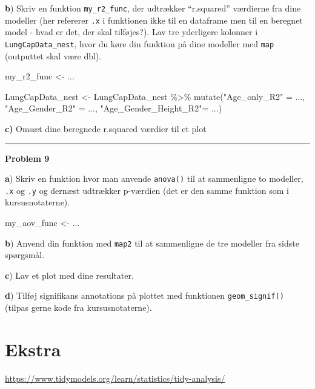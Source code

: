 \documentclass[
]{book}
\newenvironment{Shaded}{\begin{snugshade}}{\end{snugshade}}
\newcommand{\FunctionTok}[1]{\textcolor[rgb]{0.00,0.00,0.00}{#1}}
\newcommand{\NormalTok}[1]{#1}
\newcommand{\OtherTok}[1]{\textcolor[rgb]{0.56,0.35,0.01}{#1}}
\newcommand{\SpecialCharTok}[1]{\textcolor[rgb]{0.00,0.00,0.00}{#1}}
\newcommand{\StringTok}[1]{\textcolor[rgb]{0.31,0.60,0.02}{#1}}
\begin{document}
\textbf{b}) Skriv en funktion \texttt{my\_r2\_func}, der udtrækker ``r.squared'' værdierne fra dine modeller (her refererer \texttt{.x} i funktionen ikke til en dataframe men til en beregnet model - hvad er det, der skal tilføjes?). Lav tre yderligere kolonner i \texttt{LungCapData\_nest}, hvor du køre din funktion på dine modeller med \texttt{map} (outputtet skal være dbl).

\begin{Shaded}
\begin{Highlighting}[]
\NormalTok{my\_r2\_func }\OtherTok{\textless{}{-}}\NormalTok{ ...}
\end{Highlighting}
\end{Shaded}

\begin{Shaded}
\begin{Highlighting}[]
\NormalTok{LungCapData\_nest }\OtherTok{\textless{}{-}}\NormalTok{ LungCapData\_nest }\SpecialCharTok{\%\textgreater{}\%}
  \FunctionTok{mutate}\NormalTok{(}\StringTok{"Age\_only\_R2"} \OtherTok{=}\NormalTok{ ...,}
         \StringTok{"Age\_Gender\_R2"} \OtherTok{=}\NormalTok{ ...,}
         \StringTok{"Age\_Gender\_Height\_R2"}\OtherTok{=}\NormalTok{ ...)}
\end{Highlighting}
\end{Shaded}

\textbf{c)} Omsæt dine beregnede r.squared værdier til et plot

\begin{center}\rule{0.5\linewidth}{0.5pt}\end{center}

\textbf{Problem 9}

\textbf{a}) Skriv en funktion hvor man anvende \texttt{anova()} til at sammenligne to modeller, \texttt{.x} og \texttt{.y} og dernæst udtrækker p-værdien (det er den samme funktion som i kursusnotaterne).

\begin{Shaded}
\begin{Highlighting}[]
\NormalTok{my\_aov\_func }\OtherTok{\textless{}{-}}\NormalTok{ ...}
\end{Highlighting}
\end{Shaded}

\textbf{b}) Anvend din funktion med \texttt{map2} til at sammenligne de tre modeller fra sidste spørgsmål.

\textbf{c}) Lav et plot med dine resultater.

\textbf{d}) Tilføj signifikans annotations på plottet med funktionen \texttt{geom\_signif()} (tilpas gerne kode fra kursusnotaterne).

\hypertarget{ekstra}{%
\section{Ekstra}\label{ekstra}}

\url{https://www.tidymodels.org/learn/statistics/tidy-analysis/}

  
\end{document}
